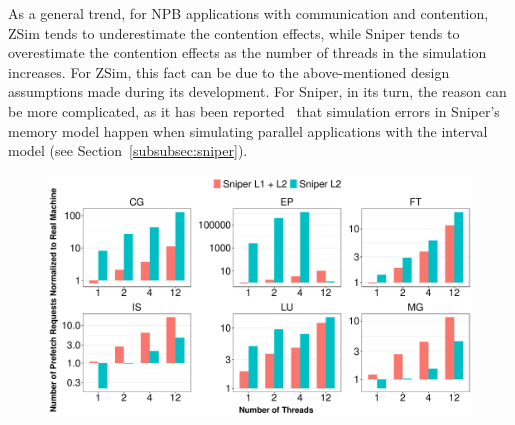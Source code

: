 \documentclass[AMA,final,STIX1COL]{WileyNJD-v2}
\newcommand\new[1]{{\color{red}{#1}}}
\begin{document}
As a general trend, for NPB applications with communication and contention, ZSim tends to underestimate the contention effects, while Sniper tends to overestimate the contention effects as the number of threads in the simulation increases.
For ZSim, this fact can be due to the above-mentioned design assumptions made during its development. 
For Sniper, in its turn, the reason can be more complicated, as it has been reported~\cite{carlson2014aeohmcm} that simulation errors in Sniper's memory model happen when simulating parallel applications with the interval model (see Section~\ref{subsubsec:sniper}). 



\begin{figure}[!htb]
    \centering
    \includegraphics[width=\linewidth]{figures/prefetch-requests-real-sim.pdf}
    \caption{\new{Number of prefetches issued by the simulation with Sniper's prefetchers, in ratio of their real counterparts. (log scale on $y$ axis).}}
    \label{fig:sniper_l2-rqsts-all-pf}
\end{figure}
\end{document}
